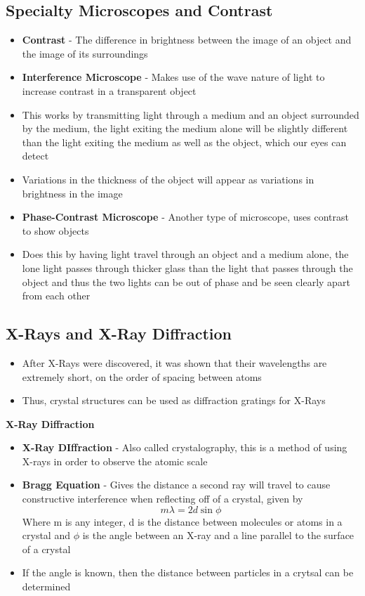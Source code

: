 \subsection{Specialty Microscopes and Contrast}
\begin{itemize}
    \item \textbf{Contrast} - The difference in brightness between the image of an object and the image of its surroundings
    \item \textbf{Interference Microscope} - Makes use of the wave nature of light to increase contrast in a transparent object
    \item This works by transmitting light through a medium and an object surrounded by the medium, the light exiting the medium alone will be slightly different than the light exiting the medium as well as the object, which our eyes can detect
    \item Variations in the thickness of the object will appear as variations in brightness in the image
    \item \textbf{Phase-Contrast Microscope} - Another type of microscope, uses contrast to show objects
    \item Does this by having light travel through an object and a medium alone, the lone light passes through thicker glass than the light that passes through the object and thus the two lights can be out of phase and be seen clearly apart from each other
\end{itemize}

\subsection{X-Rays and X-Ray Diffraction }
\begin{itemize}
    \item After X-Rays were discovered, it was shown that their wavelengths are extremely short, on the order of spacing between atoms
    \item Thus, crystal structures can be used as diffraction gratings for X-Rays
\end{itemize}

\textbf{X-Ray Diffraction}
\begin{itemize}
    \item \textbf{X-Ray DIffraction} - Also called crystalography, this is a method of using X-rays in order to observe the atomic scale
    \item \textbf{Bragg Equation} - Gives the distance a second ray will travel to cause constructive interference when reflecting off of a crystal, given by \[m\lambda=2d\sin{\phi}\]
    Where m is any integer, d is the distance between molecules or atoms in a crystal and \(\phi\) is the angle between an X-ray and a line parallel to the surface of a crystal
    \item If the angle is known, then the distance between particles in a crytsal can be determined 
\end{itemize}

